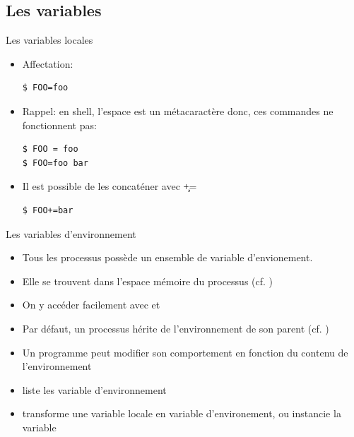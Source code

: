 \subsection{Les variables}

\begin{frame}[fragile=singleslide]{Les variables locales}
  \begin{itemize}
  \item Affectation:
    \begin{lstlisting}
$ FOO=foo
    \end{lstlisting}
  \item  Rappel: en  shell, l'espace  est un  métacaractère  donc, ces
    commandes ne fonctionnent pas:
    \begin{lstlisting}
$ FOO = foo
$ FOO=foo bar
    \end{lstlisting}
  \item Il est possible de les concaténer avec \c{+=}
    \begin{lstlisting}
$ FOO+=bar
    \end{lstlisting}
  \end{itemize}
\end{frame}


\begin{frame}[fragile=singleslide]{Les variables d'environnement}
  \begin{itemize}
  \item   Tous  les   processus  possède   un  ensemble   de  variable
    d'envionement.
  \item  Elle   se  trouvent   dans  l'espace  mémoire   du  processus
    (cf. )
  \item   On   y    accéder   facilement   avec      et
  \item  Par défaut,  un processus  hérite de  l'environnement  de son
    parent (cf. )
  \item  Un programme peut  modifier son  comportement en  fonction du
    contenu de l'environnement
  \item {} liste les variable d'environnement
  \item {} transforme  une variable locale  en variable
    d'environement, ou instancie la variable
  \end{itemize}
\end{frame}

